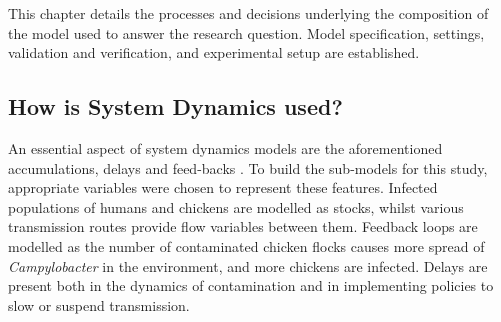
This chapter details the processes and decisions underlying the composition of the model used to answer the research question. Model specification, settings, validation and verification, and experimental setup are established.

\subsection{How is System Dynamics used?}
An essential aspect of system dynamics models are the aforementioned accumulations, delays and feed-backs \parencite{sterman_system_2001}. To build the sub-models for this study, appropriate variables were chosen to represent these features. Infected populations of humans and chickens are modelled as stocks, whilst various transmission routes provide flow variables between them. Feedback loops are modelled as the number of contaminated chicken flocks causes more spread of \textit{Campylobacter} in the environment, and more chickens are infected. Delays are present both in the dynamics of contamination and in implementing policies to slow or suspend transmission.


